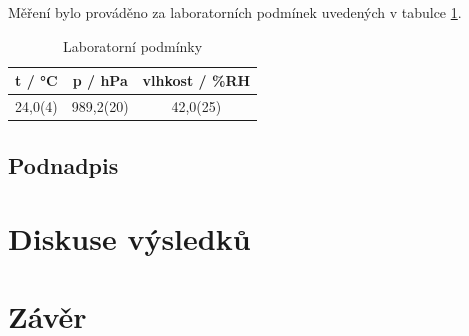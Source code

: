     Měření bylo prováděno za laboratorních podmínek uvedených v tabulce \ref{tab:lab_pod}.

    \begin{table}[h]
        \centering
        \begin{tabular}{|c|c|c|} 
        \hline
            t / °C & p / hPa & vlhkost / \%RH  \\ 
        \hline
            24,0(4)   & 989,2(20)   & 42,0(25)            \\
        \hline
        \end{tabular}
        \caption{Laboratorní podmínky}
        \label{tab:lab_pod}
    \end{table}

\subsection{Podnadpis}

    
\section{Diskuse výsledků}

\section{Závěr}
